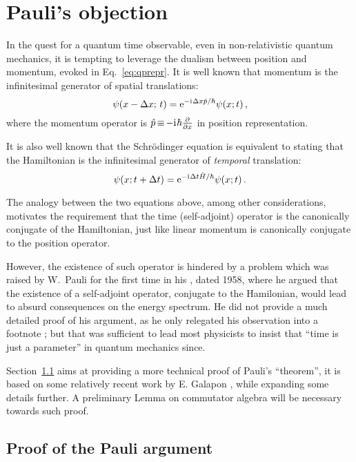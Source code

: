 \section{Pauli's objection}\label{proof}

In the quest for a quantum time observable,
even in non-relativistic quantum mechanics,
it is tempting to leverage
the dualism between position and momentum,
evoked in Eq.~\eqref{eq:qprepr}.
It is well known that momentum is the infinitesimal generator of spatial translations:
\begin{equation}
  \psi(x-\Delta x; \, t) = \mathrm{e}^{-\mathrm{i}\mkern1mu \Delta x \hat{p} / \hbar} \psi(x; t) \,\text{,}
\end{equation}
where the momentum operator is $\hat{p} \operatorname*{\equiv} -\mathrm{i}\mkern1mu\hbar \pdv{x}$ in position representation.

It is also well known that the Schr\"odinger equation is equivalent to
stating that the Hamiltonian is the infinitesimal generator of
\emph{temporal} translation:
\begin{equation}
  \psi(x; t+\Delta t) = \mathrm{e}^{-\mathrm{i}\mkern1mu \Delta t \hat{H} / \hbar} \psi(x; t) \,\text{.}
\end{equation}

The analogy between the two equations above,
among other considerations,
motivates the requirement that
the time (self-adjoint) operator is the canonically conjugate of the Hamiltonian,
just like linear momentum is canonically conjugate to the position operator.

However, the existence of such operator is hindered by a problem
which was raised by W.~Pauli for the first time
in his , dated 1958,
where he argued that the existence of a self-adjoint operator,
conjugate to the Hamilonian,
would lead to absurd consequences on the energy spectrum.
He did not provide a much detailed proof of his argument,
as he only relegated his observation into a footnote
\parencite{PauliFootnote}; but that was sufficient to
lead most physicists to insist that ``time is just a parameter''
in quantum mechanics
since.

Section~\ref{sec:pauliproof} aims at providing
a more technical proof of Pauli's ``theorem'',
it is based on some relatively recent work by
E. Galapon \parencite{Galapon2002},
while expanding some details further.
A preliminary Lemma on commutator algebra will be necessary
towards such proof.


\subsection{Proof of the Pauli argument}\label{sec:pauliproof}

